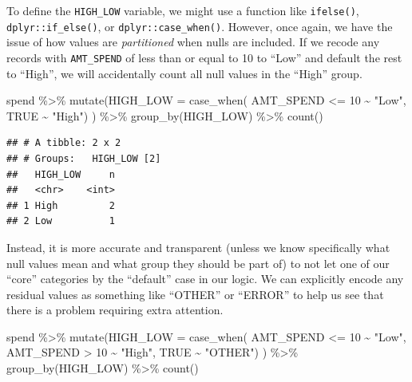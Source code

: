 \documentclass[
]{krantz}
\makeatletter
\newenvironment{Shaded}{\begin{snugshade}}{\end{snugshade}}
\newcommand{\AttributeTok}[1]{\textcolor[rgb]{0.61,0.61,0.61}{#1}}
\newcommand{\ConstantTok}[1]{\textcolor[rgb]{0,0,0}{#1}}
\newcommand{\DecValTok}[1]{\textcolor[rgb]{0.06,0.06,0.06}{#1}}
\newcommand{\FunctionTok}[1]{\textcolor[rgb]{0,0,0}{#1}}
\newcommand{\NormalTok}[1]{#1}
\newcommand{\SpecialCharTok}[1]{\textcolor[rgb]{0,0,0}{#1}}
\newcommand{\StringTok}[1]{\textcolor[rgb]{0.5,0.5,0.5}{#1}}
\newenvironment{kframe}{%
\medskip{}
\setlength{\fboxsep}{.8em}
 \def\at@end@of@kframe{}%
 \ifinner\ifhmode%
  \def\at@end@of@kframe{\end{minipage}}%
  \begin{minipage}{\columnwidth}%
 \fi\fi%
 \def\FrameCommand##1{\hskip\@totalleftmargin \hskip-\fboxsep
 \colorbox{shadecolor}{##1}\hskip-\fboxsep
     \hskip-\linewidth \hskip-\@totalleftmargin \hskip\columnwidth}%
 \MakeFramed {\advance\hsize-\width
   \@totalleftmargin\z@ \linewidth\hsize
   \@setminipage}}%
 {\par\unskip\endMakeFramed%
 \at@end@of@kframe}
\renewenvironment{Shaded}{\begin{kframe}}{\end{kframe}}
\makeatother
\begin{document}
To define the \texttt{HIGH\_LOW} variable, we might use a function like \texttt{ifelse()}, \texttt{dplyr::if\_else()}, or \texttt{dplyr::case\_when()}.
However, once again, we have the issue of how values are \emph{partitioned} when nulls are included.
If we recode any records with \texttt{AMT\_SPEND} of less than or equal to 10 to ``Low'' and default the rest to ``High'', we will accidentally count all null values in the ``High'' group.

\begin{Shaded}
\begin{Highlighting}[]
\NormalTok{spend }\SpecialCharTok{\%\textgreater{}\%}
  \FunctionTok{mutate}\NormalTok{(}\AttributeTok{HIGH\_LOW =} \FunctionTok{case\_when}\NormalTok{(}
\NormalTok{    AMT\_SPEND }\SpecialCharTok{\textless{}=} \DecValTok{10} \SpecialCharTok{\textasciitilde{}} \StringTok{"Low"}\NormalTok{, }
    \ConstantTok{TRUE} \SpecialCharTok{\textasciitilde{}} \StringTok{"High"}\NormalTok{)}
\NormalTok{    ) }\SpecialCharTok{\%\textgreater{}\%}
  \FunctionTok{group\_by}\NormalTok{(HIGH\_LOW) }\SpecialCharTok{\%\textgreater{}\%} 
  \FunctionTok{count}\NormalTok{()}
\end{Highlighting}
\end{Shaded}

\begin{verbatim}
## # A tibble: 2 x 2
## # Groups:   HIGH_LOW [2]
##   HIGH_LOW     n
##   <chr>    <int>
## 1 High         2
## 2 Low          1
\end{verbatim}

Instead, it is more accurate and transparent (unless we know specifically what null values mean and what group they should be part of) to not let one of our ``core'' categories by the ``default'' case in our logic.
We can explicitly encode any residual values as something like ``OTHER'' or ``ERROR'' to help us see that there is a problem requiring extra attention.

\begin{Shaded}
\begin{Highlighting}[]
\NormalTok{spend }\SpecialCharTok{\%\textgreater{}\%}
  \FunctionTok{mutate}\NormalTok{(}\AttributeTok{HIGH\_LOW =} \FunctionTok{case\_when}\NormalTok{(}
\NormalTok{    AMT\_SPEND }\SpecialCharTok{\textless{}=} \DecValTok{10} \SpecialCharTok{\textasciitilde{}} \StringTok{"Low"}\NormalTok{, }
\NormalTok{    AMT\_SPEND }\SpecialCharTok{\textgreater{}} \DecValTok{10} \SpecialCharTok{\textasciitilde{}} \StringTok{"High"}\NormalTok{,}
    \ConstantTok{TRUE} \SpecialCharTok{\textasciitilde{}} \StringTok{"OTHER"}\NormalTok{)}
\NormalTok{    ) }\SpecialCharTok{\%\textgreater{}\%}
  \FunctionTok{group\_by}\NormalTok{(HIGH\_LOW) }\SpecialCharTok{\%\textgreater{}\%} 
  \FunctionTok{count}\NormalTok{()}
\end{Highlighting}
\end{Shaded}
\end{document}
